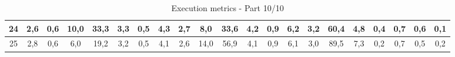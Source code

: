 \begin{sidewaystable}[]
\begin{tabular}{|c|c|c|c|c|c|c|c|c|c|c|c|c|c|c|c|c|c|c|c|c|}
    24 &  2,6                                              & 0,6                                              & 10,0                                             & 33,3                                             & 3,3                                              & 0,5                                              & 4,3                                              & 2,7                                              & 8,0                                              & 33,6                                             & 4,2                                              & 0,9                                              & 6,2                                              & 3,2                                              & 60,4                                             & 4,8                                              & 0,4                                              & 0,7                                              & 0,6                                              & 0,1                                              \\ \hline
    25 &  2,8                                              & 0,6                                              & 6,0                                              & 19,2                                             & 3,2                                              & 0,5                                              & 4,1                                              & 2,6                                              & 14,0                                             & 56,9                                             & 4,1                                              & 0,9                                              & 6,1                                              & 3,0                                              & 89,5                                             & 7,3                                              & 0,2                                              & 0,7                                              & 0,5                                              & 0,2                                              \\ \hline
    \end{tabular}
    \caption{Execution metrics - Part 10/10}
    \label{tab:ap:exec_metrics_10}
\end{sidewaystable}

